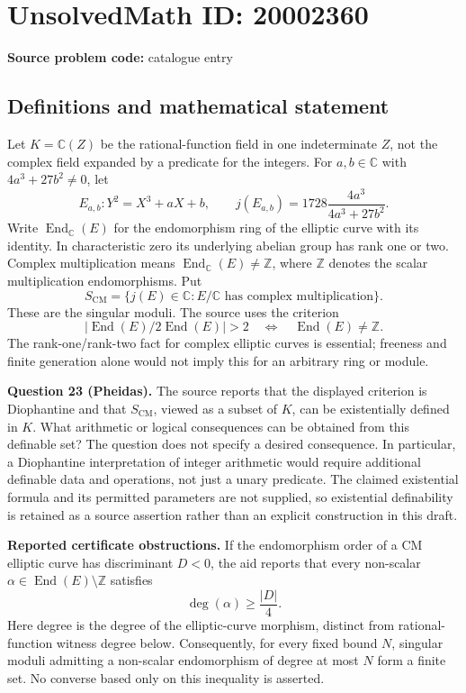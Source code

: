 \documentclass[11pt]{article}
\newcommand{\Z}{\mathbb{Z}}
\newcommand{\C}{\mathbb{C}}
\begin{document}
\section*{UnsolvedMath ID: 20002360}
\textbf{Source problem code:} catalogue entry
\subsection{Definitions and mathematical statement}
Let \(K=\C(Z)\) be the rational-function field in one indeterminate \(Z\), not the complex field expanded by a predicate for the integers. For \(a,b\in\C\) with \(4a^3+27b^2\ne0\), let
\[
 E_{a,b}:Y^2=X^3+aX+b,\qquad
 j(E_{a,b})=1728\frac{4a^3}{4a^3+27b^2}.
\]
Write \(\operatorname{End}_{\C}(E)\) for the endomorphism ring of the elliptic curve with its identity. In characteristic zero its underlying abelian group has rank one or two. Complex multiplication means \(\operatorname{End}_{\C}(E)\ne\Z\), where \(\Z\) denotes the scalar multiplication endomorphisms. Put
\[
 S_{\mathrm{CM}}=\{j(E)\in\C:E/\C\text{ has complex multiplication}\}.
\]
These are the singular moduli. The source uses the criterion
\[
 |\operatorname{End}(E)/2\operatorname{End}(E)|>2
 \quad\Longleftrightarrow\quad \operatorname{End}(E)\ne\Z.
\]
The rank-one/rank-two fact for complex elliptic curves is essential; freeness and finite generation alone would not imply this for an arbitrary ring or module.

\textbf{Question 23 (Pheidas).} The source reports that the displayed criterion is Diophantine and that \(S_{\mathrm{CM}}\), viewed as a subset of \(K\), can be existentially defined in \(K\). What arithmetic or logical consequences can be obtained from this definable set? The question does not specify a desired consequence. In particular, a Diophantine interpretation of integer arithmetic would require additional definable data and operations, not just a unary predicate. The claimed existential formula and its permitted parameters are not supplied, so existential definability is retained as a source assertion rather than an explicit construction in this draft.

\textbf{Reported certificate obstructions.} If the endomorphism order of a CM elliptic curve has discriminant \(D<0\), the aid reports that every non-scalar \(\alpha\in\operatorname{End}(E)\setminus\Z\) satisfies
\[
 \deg(\alpha)\geq\frac{|D|}{4}.
\]
Here degree is the degree of the elliptic-curve morphism, distinct from rational-function witness degree below. Consequently, for every fixed bound \(N\), singular moduli admitting a non-scalar endomorphism of degree at most \(N\) form a finite set. No converse based only on this inequality is asserted.
\end{document}
